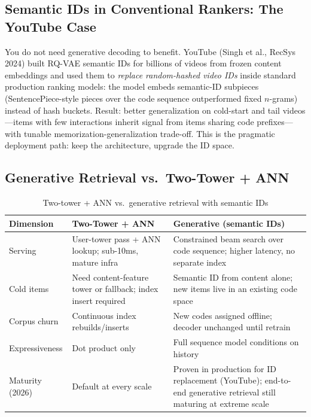 \subsection{Semantic IDs in Conventional Rankers: The YouTube Case}

You do not need generative decoding to benefit. YouTube (Singh et al., RecSys 2024) built RQ-VAE semantic IDs for billions of videos from frozen content embeddings and used them to \textit{replace random-hashed video IDs} inside standard production ranking models: the model embeds semantic-ID subpieces (SentencePiece-style pieces over the code sequence outperformed fixed $n$-grams) instead of hash buckets. Result: better generalization on cold-start and tail videos---items with few interactions inherit signal from items sharing code prefixes---with tunable memorization-generalization trade-off. This is the pragmatic deployment path: keep the architecture, upgrade the ID space.

\subsection{Generative Retrieval vs.\ Two-Tower + ANN}

\begin{table}[H]
\centering
\caption{Two-tower + ANN vs.\ generative retrieval with semantic IDs}
\begin{tabularx}{\textwidth}{lXX}
\toprule
\textbf{Dimension} & \textbf{Two-Tower + ANN} & \textbf{Generative (semantic IDs)} \\
\midrule
Serving & User-tower pass + ANN lookup; sub-10ms, mature infra & Constrained beam search over code sequence; higher latency, no separate index \\
Cold items & Need content-feature tower or fallback; index insert required & Semantic ID from content alone; new items live in an existing code space \\
Corpus churn & Continuous index rebuilds/inserts & New codes assigned offline; decoder unchanged until retrain \\
Expressiveness & Dot product only & Full sequence model conditions on history \\
Maturity (2026) & Default at every scale & Proven in production for ID replacement (YouTube); end-to-end generative retrieval still maturing at extreme scale \\
\bottomrule
\end{tabularx}
\end{table}

